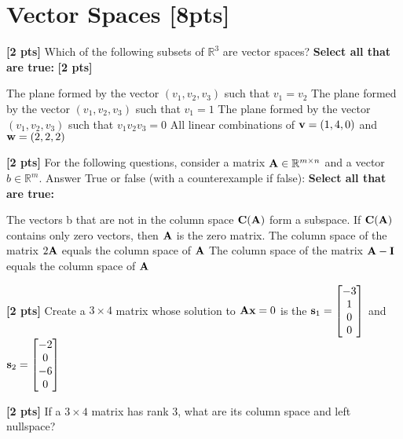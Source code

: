 \documentclass[11pt,addpoints,answers]{exam}
\numberwithin{equation}{section} %
\numberwithin{figure}{section} %
\numberwithin{table}{section} %
\begin{document}
\clearpage

\section{Vector Spaces  [8pts]}
\begin{questions}

\question \textbf{[2 pts]} Which of the following subsets of $\mathbb{R}^3$ are vector spaces?
    \textbf{Select all that are true:} \textbf{[2 pts]}
    \checkboxchar{$\Box$} \checkedchar{$\blacksquare$}
    \begin{checkboxes}
        \CorrectChoice The plane formed by the vector $(v_1, v_2, v_3) $ such that $v_1 = v_2$
        \choice The plane formed by the vector $(v_1, v_2, v_3) $ such that $v_1 = 1$
        \CorrectChoice The plane formed by the vector $(v_1, v_2, v_3) $  such that $v_1 v_2 v_3 = 0$
        \CorrectChoice All linear combinations of $\mathbf{v} = (1, 4, 0)$ and $\mathbf{w} = (2, 2, 2)$
    \end{checkboxes}

\question \textbf{[2 pts]} For the following questions, consider a matrix $\mathbf{A} \in \mathbb{R}^{m \times n}$ and a vector $b \in \mathbb{R}^m$. Answer True or false (with a counterexample if false):
    \textbf{Select all that are true:} 
    \begin{checkboxes}
        \choice The vectors b that are not in the column space $\mathbf{C}(\mathbf{A})$ form a subspace.
        \CorrectChoice If $\mathbf{C}(\mathbf{A})$ contains only zero vectors, then $\mathbf{A}$ is the zero matrix.
        \CorrectChoice The column space of the matrix $2\mathbf{A}$ equals the column space of $\mathbf{A}$
        \choice The column space of the matrix $\mathbf{A} - \mathbf{I}$ equals the column space of $\mathbf{A}$
    \end{checkboxes}

\question \textbf{[2 pts]} Create a $3 \times 4$ matrix whose solution to $\mathbf{A} \mathbf{x} = 0$ is the $\mathbf{s}_1=\begin{bmatrix}
         -3 \\
         1 \\
         0 \\
         0
        \end{bmatrix}$ and $\mathbf{s}_2=\begin{bmatrix}
         -2 \\
         0 \\
         -6 \\
         0
        \end{bmatrix}$

    \begin{tcolorbox}[fit,height=5cm, width=\textwidth, blank, borderline={0.5pt}{-2pt},halign=center, valign=center, nobeforeafter]
    \end{tcolorbox}


\question \textbf{[2 pts]} If a $3{\times}4$ matrix has rank $3$, what are its column space and left nullspace?

    \begin{tcolorbox}[fit,height=3cm, width=\textwidth, blank, borderline={0.5pt}{-2pt},halign=center, valign=center, nobeforeafter]
    \end{tcolorbox}


\end{questions}
\clearpage
\end{document}
